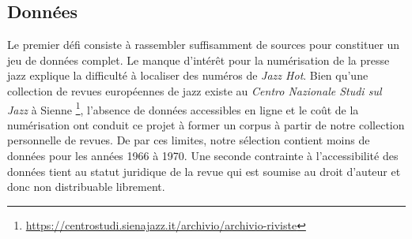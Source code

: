 \documentclass[fra, final]{anthology-ch}      %
\begin{document}
	\subsection{Données}
	
	\begin{table}
		\centering
		\vspace{-.4cm}
		\caption{Corpus complet et échantillons pour l’entraînement du modèle OCR.}
		\label{tab:full_corpus}
		\vspace{-.5cm}
	\end{table}
	Le premier défi consiste à rassembler suffisamment de sources pour constituer un jeu de données complet. Le manque d'intérêt pour la numérisation de la presse jazz explique la difficulté à localiser des numéros de \textit{Jazz Hot}. Bien qu'une collection de revues européennes de jazz existe au \textit{Centro Nazionale Studi sul Jazz} à Sienne \footnote{\url{https://centrostudi.sienajazz.it/archivio/archivio-riviste}}, l'absence de données accessibles en ligne et le coût de la numérisation ont conduit ce projet à former un corpus à partir de notre collection personnelle de revues. De par ces limites, notre sélection contient moins de données pour les années 1966 à 1970. Une seconde contrainte à l'accessibilité des données tient au statut juridique de la revue qui est soumise au droit d'auteur et donc non distribuable librement. 
	
\end{document}
